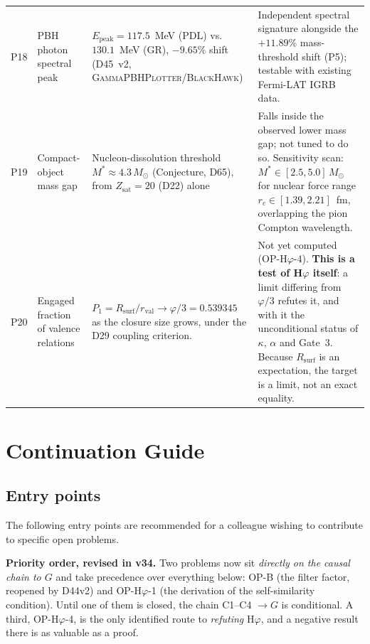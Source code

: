 \documentclass[11pt,a4paper]{article}
\theoremstyle{plain}
\theoremstyle{definition}
\theoremstyle{remark}
\newcommand{\rval}{r_{\mathrm{val}}}
\newcommand{\Rsurf}{R_{\mathrm{surf}}}
\newcommand{\Zsat}{Z_{\mathrm{sat}}}
\begin{document}
\begin{longtable}{L{0.5cm}L{3.2cm}L{5.2cm}L{4.2cm}}
P18 & PBH photon spectral peak & $E_{\mathrm{peak}}=117.5$~MeV (PDL) vs.\ $130.1$~MeV (GR), $-9.65\%$ shift (D45~v2, \textsc{GammaPBHPlotter}/\textsc{BlackHawk}) & Independent spectral signature alongside the $+11.89\%$ mass-threshold shift (P5); testable with existing Fermi-LAT IGRB data.\\[0.4em]
P19 & Compact-object mass gap & Nucleon-dissolution threshold $M^*\approx4.3\,M_\odot$ (Conjecture, D65), from $\Zsat=20$ (D22) alone & Falls inside the observed lower mass gap; not tuned to do so. Sensitivity scan: $M^*\in[2.5,5.0]\,M_\odot$ for nuclear force range $r_c\in[1.39,2.21]$~fm, overlapping the pion Compton wavelength.\\[0.4em]
P20 & Engaged fraction of valence relations & $P_1=\Rsurf/\rval \to \varphi/3 = 0.539345$ as the closure size grows, under the D29 coupling criterion. & \textcolor{openproblemred}{Not yet computed} (OP-H$\varphi$-4). \textbf{This is a test of H$\varphi$ itself}: a limit differing from $\varphi/3$ refutes it, and with it the unconditional status of $\kappa$, $\alpha$ and Gate~3. Because $\Rsurf$ is an expectation, the target is a limit, not an exact equality.\\[0.3em]
\end{longtable}

\section{Continuation Guide}
\label{sec:continuation}

\subsection{Entry points}
\label{subsec:entrypoints}
The following entry points are recommended for a colleague wishing to contribute to specific open problems.

\textcolor{negativered}{\textbf{Priority order, revised in v34.}} Two problems now sit \emph{directly on the causal chain to $G$} and take precedence over everything below: OP-B (the filter factor, reopened by D44v2) and OP-H$\varphi$-1 (the derivation of the self-similarity condition). Until one of them is closed, the chain C1--C4 $\to G$ is conditional. A third, OP-H$\varphi$-4, is the only identified route to \emph{refuting} H$\varphi$, and a negative result there is as valuable as a proof.
\end{document}
